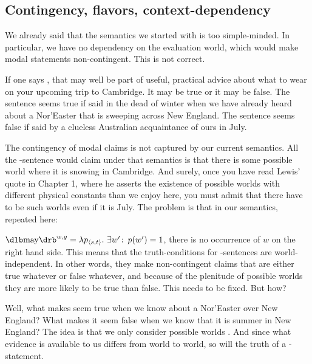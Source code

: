 

\subsection{Contingency, flavors, context-dependency} \label{sec:contingency}

We already said that the semantics we started with is too simple-minded. In
particular, we have no dependency on the evaluation world, which would make
modal statements non-contingent. This is not correct.

If one says , that may well be part
of useful, practical advice about what to wear on your upcoming trip to
Cambridge. It may be true or it may be false. The sentence seems true if said in
the dead of winter when we have already heard about a Nor'Easter that is
sweeping across New England. The sentence seems false if said by a clueless
Australian acquaintance of ours in July.

The contingency of modal claims is not captured by our current semantics. All
the -sentence would claim under that semantics is that there is
some possible world where it is snowing in Cambridge. And surely, once you have
read Lewis' quote in Chapter 1, where he asserts the existence of possible
worlds with different physical constants than we enjoy here, you must admit that
there have to be such worlds even if it is July. The problem is that in our
semantics, repeated here:

\ex $\sv{\mbox{may}}^{w,g} = \lambda p_{\type{s,t}}.\ \exists w'\co p(w') =
1$, \xe
%
%
there is no occurrence of $w$ on the right hand side. This means that the
truth-conditions for -sentences are world-independent. In other
words, they make non-contingent claims that are either true whatever or false
whatever, and because of the plenitude of possible worlds they are more likely
to be true than false. This needs to be fixed. But how?

Well, what makes  seem true when we
know about a Nor'Easter over New England? What makes it seem false when we know
that it is summer in New England? The idea is that we only consider possible
worlds . And since what
evidence is available to us differs from world to world, so will the truth of a
-statement.

